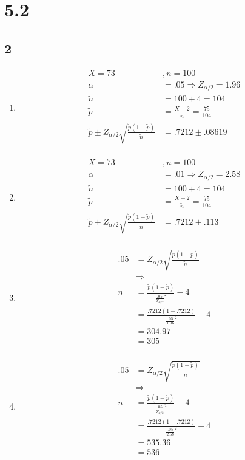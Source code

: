 \documentclass[12pt]{report}
\begin{document}
\section*{5.2}
   \subsection*{2}
   \begin{enumerate}[label={\bf \alph*}]
   \item
      \begin{align*}
         X=73&,n=100\\
         \alpha&=.05\Rightarrow Z_{\alpha/2}=1.96\\
         \widetilde{n}&=100+4=104\\
         \widetilde{p}&=\frac{X+2}{\widetilde{n}}=\frac{75}{104}\\
         \widetilde{p}\pm Z_{\alpha/2}\sqrt{\frac{\widetilde{p}(1-\widetilde{p})}{\widetilde{n}}}&=.7212\pm.08619\\
      \end{align*}
    \item
      \begin{align*}
         X=73&,n=100\\
         \alpha&=.01\Rightarrow Z_{\alpha/2}=2.58\\
         \widetilde{n}&=100+4=104\\
         \widetilde{p}&=\frac{X+2}{\widetilde{n}}=\frac{75}{104}\\
         \widetilde{p}\pm Z_{\alpha/2}\sqrt{\frac{\widetilde{p}(1-\widetilde{p})}{\widetilde{n}}}&=.7212\pm.113\\
      \end{align*}
   \item
      \begin{align*}
      .05&=Z_{\alpha/2}\sqrt{\frac{\widetilde{p}(1-\widetilde{p})}{\widetilde{n}}}\\&\Rightarrow\\
      n&=\frac{\widetilde{p}(1-\widetilde{p})}{\frac{.05}{Z_{\alpha/2}}^2}-4\\
       &=\frac{.7212(1-.7212)}{\frac{.05}{1.96}^2}-4\\
       &=304.97\\
       &=305\\
      \end{align*}
   \item
      \begin{align*}
      .05&=Z_{\alpha/2}\sqrt{\frac{\widetilde{p}(1-\widetilde{p})}{\widetilde{n}}}\\&\Rightarrow\\
      n&=\frac{\widetilde{p}(1-\widetilde{p})}{\frac{.05}{Z_{\alpha/2}}^2}-4\\
       &=\frac{.7212(1-.7212)}{\frac{.05}{2.58}^2}-4\\
       &=535.36\\
       &=536
      \end{align*}
   \end{enumerate}
\end{document}
